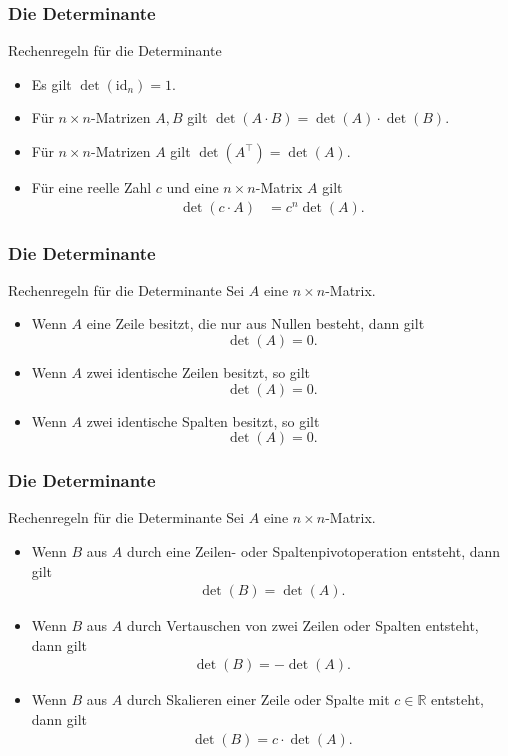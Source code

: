 \documentclass{beamer}
\newcommand\RR{\mathbb R}
\newcommand{\id}{\mathrm{id}}
\newcommand{\trans}{\top}
\newcommand{\ue}{\"u}
\newcommand{\mytitle}{Die Determinante}
\begin{document}
\begin{frame}\frametitle{\mytitle}
	\begin{block}{Rechenregeln f\ue r die Determinante}
		\begin{itemize}
			\item Es gilt $\det(\id_n)=1$.
			\item F\ue r $n\times n$-Matrizen $A,B$ gilt $\det(A\cdot B)=\det(A)\cdot\det(B)$.
			\item F\ue r $n\times n$-Matrizen $A$ gilt $\det(A^\trans)=\det(A)$.
			\item F\ue r eine reelle Zahl $c$ und eine $n\times n$-Matrix $A$ gilt
				\begin{align*}
					\det(c\cdot A)&=c^n\det(A).
				\end{align*}
		\end{itemize}
	\end{block}
\end{frame}

\begin{frame}\frametitle{\mytitle}
	\begin{block}{Rechenregeln f\ue r die Determinante}
		Sei $A$ eine $n\times n$-Matrix.
		\begin{itemize}
			\item Wenn $A$ eine Zeile besitzt, die nur aus Nullen besteht, dann gilt
				$$\det(A)=0.$$
			\item Wenn $A$ zwei identische Zeilen besitzt, so gilt
				$$\det(A)=0.$$
			\item Wenn $A$ zwei identische Spalten besitzt, so gilt
				$$\det(A)=0.$$
		\end{itemize}
	\end{block}
\end{frame}

\begin{frame}\frametitle{\mytitle}
	\begin{block}{Rechenregeln f\ue r die Determinante}
		Sei $A$ eine $n\times n$-Matrix.
		\begin{itemize}
			\item Wenn $B$ aus $A$ durch eine \alert{Zeilen- oder Spaltenpivotoperation} entsteht, dann gilt
				\begin{align*}
					\det(B)=\det(A).
				\end{align*}
			\item Wenn $B$ aus $A$ durch \alert{Vertauschen} von zwei Zeilen oder Spalten entsteht, dann gilt
				\begin{align*}
					\det(B)=-\det(A).
				\end{align*}
			\item Wenn $B$ aus $A$ durch \alert{Skalieren} einer Zeile oder Spalte mit $c\in\RR$ entsteht, dann gilt
				\begin{align*}
					\det(B)=c\cdot\det(A).
				\end{align*}
		\end{itemize}
	\end{block}
\end{frame}
\end{document}
